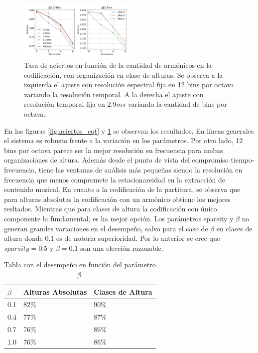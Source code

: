 \documentclass
  [ams,pdfout]%
	{aeslac}
\begin{document}
\begin{figure}[h!]
\begin{center}
\includegraphics[width=0.5\textwidth]{imagenes/aciertos_chroma} 
\caption{Tasa de aciertos en función de la cantidad de armónicos en la codificación, con organización en clase de alturas. Se observa a la izquierda el ajuste con resolución espectral fija en 12 bins por octava variando la resolución temporal. A la derecha el ajuste con resolución temporal fija en $2.9ms$ variando la cantidad de bins por octava. }
\label{fig:aciertos_chroma}
\end{center}
\end{figure} 

En las figuras \ref{fig:aciertos_cqt} y \ref{fig:aciertos_chroma} se observan los resultados. En líneas generales el sistema es robusto frente a la variación en los parámetros. Por otro lado, 12 bins por octava parece ser la mejor resolución en frecuencia para ambas organizaciones de altura. Además desde el punto de vista del compromiso tiempo-frecuencia, tiene las ventanas de análisis más pequeñas siendo la resolución en frecuencia que menos compromete la estacionareidad en la extracción de contenido musical. En cuanto a la codificación de la partitura, se observa que para alturas absolutas la codificación con un armónico obtiene los mejores resltados. Mientras que para clases de altura la codificación con único componente la fundamental, es ka mejor opción. Los parámetros sparsity y $\beta$ no generan grandes variaciones en el desempeño, salvo para el caso de $\beta$ en clases de altura donde 0.1 es de notoria superioridad. Por lo anterior se cree que $sparsity=0.5$ y $\beta=0.1$ son una elección razonable. 

\begin{table}[!ht]
\caption{Tabla con el desempeño en función del parámetro $\beta$.}
\label{tab:beta}
\vspace*{10pt}
\centering
\small
\begin{tabular}{lll}
\textbf{$\beta$}	&	\textbf{Alturas Absolutas} &	\textbf{Clases de Altura}\\ \hline
0.1 & 82\% & 90\% \\
0.4 & 77\% & 87\% \\
0.7 & 76\% & 86\% \\
1.0 & 76\% & 86\% \\
\end{tabular}
\end{table}
\end{document}
